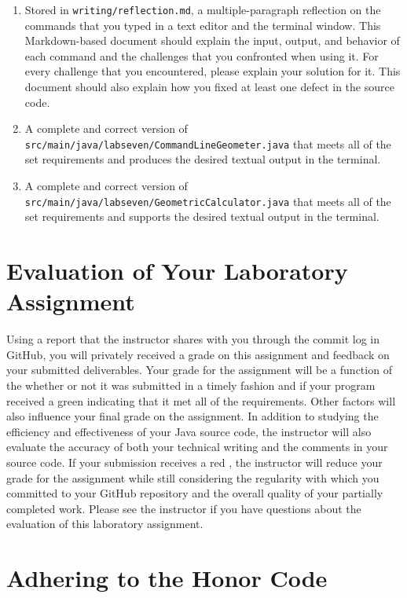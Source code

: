 \documentclass[11pt]{article}
\newcommand{\mainprogramsource}{\lstinline{src/main/java/labseven/CommandLineGeometer.java}}
\newcommand{\secondprogramsource}{\lstinline{src/main/java/labseven/GeometricCalculator.java}}
\newcommand{\reflection}{\lstinline{writing/reflection.md}}
\newcommand{\checkmark}{\ding{51}}
\newcommand{\naughtmark}{\ding{55}}
\begin{document}
\begin{enumerate}

  \setlength{\itemsep}{0in}

\item Stored in \reflection{}, a multiple-paragraph reflection on the commands
  that you typed in a text editor and the terminal window. This Markdown-based
  document should explain the input, output, and behavior of each command and
  the challenges that you confronted when using it. For every challenge that you
  encountered, please explain your solution for it. This document should also
  explain how you fixed at least one defect in the source code.

\item A complete and correct version of \mainprogramsource{} that meets all of
  the set requirements and produces the desired textual output in the terminal.

\item A complete and correct version of \secondprogramsource{} that meets all of
  the set requirements and supports the desired textual output in the terminal.

\end{enumerate}

\section*{Evaluation of Your Laboratory Assignment}

Using a report that the instructor shares with you through the commit log in
GitHub, you will privately received a grade on this assignment and feedback on
your submitted deliverables. Your grade for the assignment will be a function of
the whether or not it was submitted in a timely fashion and if your program
received a green \checkmark{} indicating that it met all of the requirements.
Other factors will also influence your final grade on the assignment. In
addition to studying the efficiency and effectiveness of your Java source code,
the instructor will also evaluate the accuracy of both your technical writing
and the comments in your source code. If your submission receives a red
\naughtmark{}, the instructor will reduce your grade for the assignment while
still considering the regularity with which you committed to your GitHub
repository and the overall quality of your partially completed work. Please see
the instructor if you have questions about the evaluation of this laboratory
assignment.

\section*{Adhering to the Honor Code}
\end{document}
